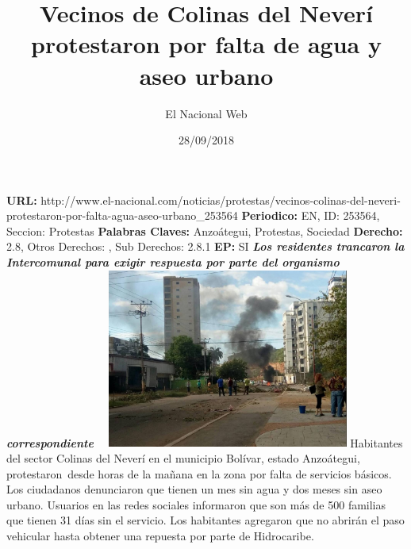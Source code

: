 \documentclass{article}%
\title{\textbf{Vecinos de Colinas del Neverí protestaron por falta de agua y aseo urbano}}%
\author{El Nacional Web}%
\date{28/09/2018}%
\begin{document}
%
\normalsize%
\maketitle%
\textbf{URL: }%
http://www.el{-}nacional.com/noticias/protestas/vecinos{-}colinas{-}del{-}neveri{-}protestaron{-}por{-}falta{-}agua{-}aseo{-}urbano\_253564\newline%
%
\textbf{Periodico: }%
EN, %
ID: %
253564, %
Seccion: %
Protestas\newline%
%
\textbf{Palabras Claves: }%
Anzoátegui, Protestas, Sociedad\newline%
%
\textbf{Derecho: }%
2.8, %
Otros Derechos: %
, %
Sub Derechos: %
2.8.1\newline%
%
\textbf{EP: }%
SI\newline%
\newline%
%
\textbf{\textit{Los residentes trancaron la Intercomunal para exigir respuesta por parte del organismo correspondiente ~}}%
\newline%
\newline%
%
\includegraphics[width=300px]{154.jpg}%
\newline%
%
Habitantes del sector Colinas del Neverí en el municipio Bolívar, estado Anzoátegui, protestaron~desde horas de la mañana en la zona por falta de servicios básicos.%
\newline%
%
Los ciudadanos denunciaron que tienen un mes sin agua y dos meses sin aseo urbano. Usuarios en las redes sociales informaron que son más de 500 familias que tienen 31 días sin el servicio.%
\newline%
%
Los habitantes agregaron que no abrirán el paso vehicular hasta obtener una repuesta por parte de Hidrocaribe.%
\newline%
%
\end{document}
